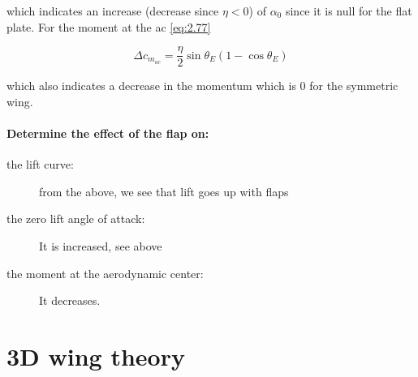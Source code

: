 \documentclass[british,french,11pt, a4paper, openany]{article}
\begin{document}
	which indicates an increase (decrease since $\eta <0$) of $\alpha _0$ since it is null for the flat plate. For the moment at the ac \eqref{eq:2.77}
	
	\begin{equation}
	\Delta c_{m_{ac}} = \frac{\eta }{2} \sin \theta _E (1- \cos \theta _E)
	\end{equation}
	
	which also indicates a decrease in the momentum which is 0 for the symmetric wing.
\paragraph{Determine the effect of the flap on:}
\begin{description}
	\item[the lift curve:] from the above, we see that lift goes up with flaps
	\item[the zero lift angle of attack:] It is increased, see above
	\item[the moment at the aerodynamic center:] It decreases.
\end{description}



\section{3D wing theory}
\end{document}
